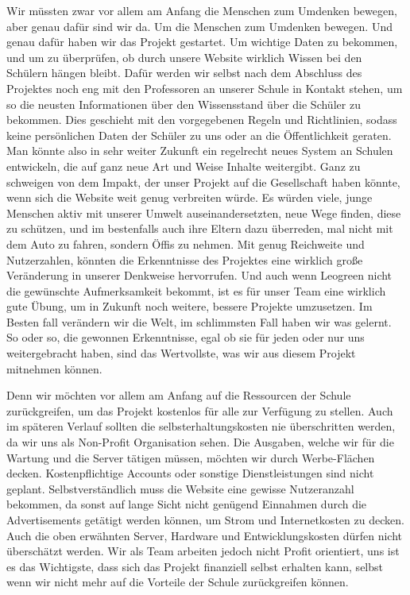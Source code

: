 Wir müssten zwar vor allem am Anfang die Menschen zum Umdenken bewegen, aber genau dafür sind wir da. Um die Menschen zum Umdenken bewegen. Und genau dafür haben wir das Projekt gestartet. Um wichtige Daten zu bekommen, und um zu überprüfen, ob durch unsere Website wirklich Wissen bei den Schülern hängen bleibt. Dafür werden wir selbst nach dem Abschluss des Projektes noch eng mit den Professoren an unserer Schule in Kontakt stehen, um so die neusten Informationen über den Wissensstand über die Schüler zu bekommen. Dies geschieht mit den vorgegebenen Regeln und Richtlinien, sodass keine persönlichen Daten der Schüler zu uns oder an die Öffentlichkeit geraten. Man könnte also in sehr weiter Zukunft ein regelrecht neues System an Schulen entwickeln, die auf ganz neue Art und Weise Inhalte weitergibt. Ganz zu schweigen von dem Impakt, der unser Projekt auf die Gesellschaft haben könnte, wenn sich die Website weit genug verbreiten würde. Es würden viele, junge Menschen aktiv mit unserer Umwelt auseinandersetzten, neue Wege finden, diese zu schützen, und im bestenfalls auch ihre Eltern dazu überreden, mal nicht mit dem Auto zu fahren, sondern Öffis zu nehmen. Mit genug Reichweite und Nutzerzahlen, könnten die Erkenntnisse des Projektes eine wirklich große Veränderung in unserer Denkweise hervorrufen. Und auch wenn Leogreen nicht die gewünschte Aufmerksamkeit bekommt, ist es für unser Team eine wirklich gute Übung, um in Zukunft noch weitere, bessere Projekte umzusetzen. Im Besten fall verändern wir die Welt, im schlimmsten Fall haben wir was gelernt. So oder so, die gewonnen Erkenntnisse, egal ob sie für jeden oder nur uns weitergebracht haben, sind das Wertvollste, was wir aus diesem Projekt mitnehmen können. 

Denn wir möchten vor allem am Anfang auf die Ressourcen der Schule zurückgreifen, um das Projekt kostenlos für alle zur Verfügung zu stellen. Auch im späteren Verlauf sollten die selbsterhaltungskosten nie überschritten werden, da wir uns als Non-Profit Organisation sehen. Die Ausgaben, welche wir für die Wartung und die Server tätigen müssen, möchten wir durch Werbe-Flächen decken. Kostenpflichtige Accounts oder sonstige Dienstleistungen sind nicht geplant. Selbstverständlich muss die Website eine gewisse Nutzeranzahl bekommen, da sonst auf lange Sicht nicht genügend Einnahmen durch die Advertisements getätigt werden können, um Strom und Internetkosten zu decken. Auch die oben erwähnten Server, Hardware und Entwicklungskosten dürfen nicht überschätzt werden. Wir als Team arbeiten jedoch nicht Profit orientiert, uns ist es das Wichtigste, dass sich das Projekt finanziell selbst erhalten kann, selbst wenn wir nicht mehr auf die Vorteile der Schule zurückgreifen können. 

